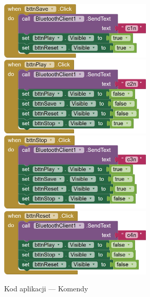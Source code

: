 \documentclass[11pt,titlepage]{article}
\begin{document}
\newpage

\begin{figure}[p]
    \begin{center}
        \includegraphics[width=0.65\textwidth]{img/app_src/commands/Save.png}
        \includegraphics[width=0.65\textwidth]{img/app_src/commands/Play.png}
        \includegraphics[width=0.65\textwidth]{img/app_src/commands/Stop.png}
        \includegraphics[width=0.65\textwidth]{img/app_src/commands/Reset.png}
    \end{center}
    \caption{Kod aplikacji — Komendy}
    \label{AppKomendy}
\end{figure}
\end{document}
